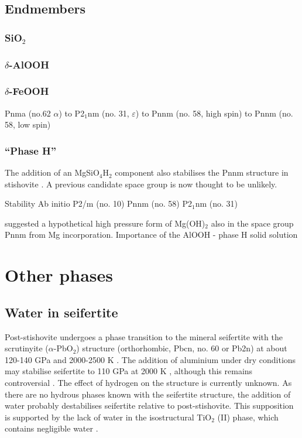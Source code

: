 \documentclass[review]{elsarticle}
\begin{document}
\subsection{Endmembers}
\subsubsection{SiO$_2$}

\subsubsection{$\delta$-AlOOH}

\subsubsection{$\delta$-FeOOH}
Pnma (no.62 $\alpha$) to P2$_{1}$nm (no. 31, $\varepsilon$) \citep{GJK2008} to Pnnm (no. 58, high spin) to Pnnm (no. 58, low spin) \citep{GQSPM2013}

\subsubsection{``Phase H''}
The addition of an MgSiO$_4$H$_2$ component also stabilises the Pnnm structure in stishovite \citep{KSK2011}. A previous candidate space group \citep[Pnn2; no. 34][]{KKSOK2004} is now thought to be unlikely.

Stability \citep{OAKSH2014}
Ab initio P2/m (no. 10) \citep{Tsuchiya2013}
Pnnm (no. 58) \citep{BNTI2014}
P2$_1$nm (no. 31) \citep{NITTNFH2014}

\cite{KKSOK2004} suggested a hypothetical high pressure form of Mg(OH)$_2$ also in the space group Pnnm from Mg incorporation.
Importance of the AlOOH - phase H solid solution \cite{OOSMHON2014}

\section{Other phases}
\cite{Ohtani2015}
\subsection{Water in seifertite}
Post-stishovite undergoes a phase transition to the mineral seifertite with the scrutinyite ($\alpha$-PbO$_2$) structure (orthorhombic, Pbcn, no. 60 or Pb2n) at about 120-140 GPa and 2000-2500 K \citep{MHOO2003, GSP2013}. The addition of aluminium under dry conditions may stabilise seifertite to 110 GPa at 2000 K \citep{HTSO2005}, although this remains controversial \citep{GSP2013}. The effect of hydrogen on the structure is currently unknown. As there are no hydrous phases known with the seifertite structure, the addition of water probably destabilises seifertite relative to post-stishovite. This supposition is supported by the lack of water in the isostructural TiO$_2$ (II) phase, which contains negligible water \citep{BHM2004}.
\end{document}
